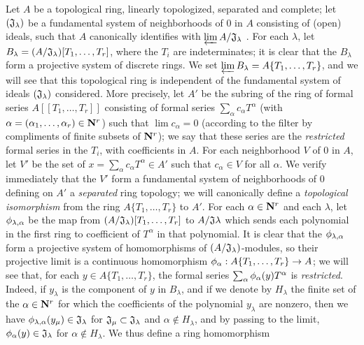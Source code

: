 \begin{env}[7.5.1]
\label{0.7.5.1}
Let $A$ be a topological ring, linearly topologized, separated and complete; let
$(\mathfrak{J}_\lambda)$ be a fundamental system of neighborhoods of $0$ in $A$
consisting of (open) ideals, such that $A$ canonically identifies with
$\varprojlim A/\mathfrak{J}_\lambda$ . For each
$\lambda$, let $B_\lambda=(A/\mathfrak{J}_\lambda)[T_1,\dots,T_r]$, where the
$T_i$ are indeterminates; it is clear that the $B_\lambda$ form a projective system
of discrete rings. We set $\varprojlim B_\lambda=A\{T_1,\dots,T_r\}$, and we will
see that this topological ring is independent of the fundamental system of ideals
$(\mathfrak{J}_\lambda)$ considered. More precisely, let $A'$ be the subring of the
ring of formal series $A[\![T_1,\dots,T_r]\!]$ consisting of formal series
$\sum_\alpha c_\alpha T^\alpha$ (with $\alpha=(\alpha_1,\dots,\alpha_r)\in\mathbf{N}^r$)
such that $\lim c_\alpha=0$ (according to the filter by compliments of finite subsets
of $\mathbf{N}^r$); we say that these series are the {\em restricted} formal series in the
$T_i$, with coefficients in $A$.
For each neighborhood $V$ of $0$ in $A$, let $V'$ be the set of
$x=\sum_\alpha c_\alpha T^\alpha\in A'$ such that $c_\alpha\in V$ for all $\alpha$.
We verify immediately that the $V'$ form a fundamental system of neighborhoods of $0$
defining on $A'$ a {\em separated} ring topology; we will canonically define a
{\em topological isomorphism} from the ring $A\{T_1,\dots,T_r\}$ to $A'$. For each
$\alpha\in\mathbf{N}^r$ and each $\lambda$, let $\phi_{\lambda,\alpha}$ be the map from
$(A/\mathfrak{J}_\lambda)[T_1,\dots,T_r]$ to $A/\mathfrak{J}\lambda$ which sends each
polynomial in the first ring to coefficient of $T^\alpha$ in that polynomial. It is
clear that the $\phi_{\lambda,\alpha}$ form a projective system of homomorphisms of
$(A/\mathfrak{J}_\lambda)$-modules, so their projective limit is a continuous
homomorphism $\phi_\alpha:A\{T_1,\dots,T_r\}\to A$; we will see that, for each
$y\in A\{T_1,\dots,T_r\}$, the formal series $\sum_\alpha\phi_\alpha(y)T^\alpha$ is
{\em restricted}. Indeed, if $y_\lambda$ is the component of $y$ in $B_\lambda$, and
if we denote by $H_\lambda$ the finite set of the $\alpha\in\mathbf{N}^r$ for which the
coefficients of the polynomial $y_\lambda$ are nonzero, then we have
$\phi_{\lambda,\alpha}(y_\mu)\in\mathfrak{J}_\lambda$ for
$\mathfrak{J}_\mu\subset\mathfrak{J}_\lambda$ and $\alpha\not\in H_\lambda$, and by
passing to the limit, $\phi_\alpha(y)\in\mathfrak{J}_\lambda$ for
$\alpha\not\in H_\lambda$. We thus define a ring homomorphism

\end{env}
